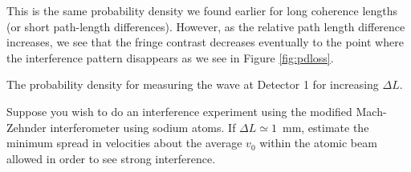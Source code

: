 This is the same probability density we found earlier for long coherence lengths (or short path-length differences). However, as the relative path length difference increases, we see that the fringe contrast decreases eventually to the point where the interference pattern disappears as we see in Figure \ref{fig:pdloss}.

\begin{marginfigure}[-2cm]
\caption{The probability density for measuring the wave at Detector 1 for increasing $\Delta L$.}
\label{fig:pdloss}
\end{marginfigure}

\begin{exercise}
 Suppose you wish to do an interference experiment using the modified Mach-Zehnder interferometer using sodium atoms.  If $\Delta L \simeq 1$~mm, estimate the minimum spread in velocities about the average $v_{0}$  within the atomic beam  allowed in order to see strong interference.
\end{exercise}

